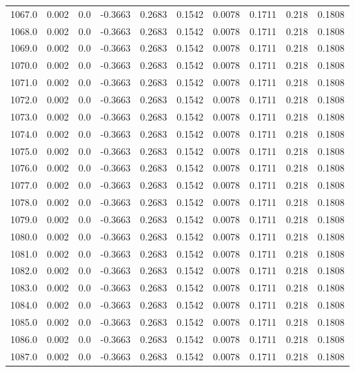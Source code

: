 \begin{longtable}{lrrrrrrrrr}
1067.0 & 0.002 & 0.0 & -0.3663 & 0.2683 & 0.1542 & 0.0078 & 0.1711 & 0.218 & 0.1808 \\
1068.0 & 0.002 & 0.0 & -0.3663 & 0.2683 & 0.1542 & 0.0078 & 0.1711 & 0.218 & 0.1808 \\
1069.0 & 0.002 & 0.0 & -0.3663 & 0.2683 & 0.1542 & 0.0078 & 0.1711 & 0.218 & 0.1808 \\
1070.0 & 0.002 & 0.0 & -0.3663 & 0.2683 & 0.1542 & 0.0078 & 0.1711 & 0.218 & 0.1808 \\
1071.0 & 0.002 & 0.0 & -0.3663 & 0.2683 & 0.1542 & 0.0078 & 0.1711 & 0.218 & 0.1808 \\
1072.0 & 0.002 & 0.0 & -0.3663 & 0.2683 & 0.1542 & 0.0078 & 0.1711 & 0.218 & 0.1808 \\
1073.0 & 0.002 & 0.0 & -0.3663 & 0.2683 & 0.1542 & 0.0078 & 0.1711 & 0.218 & 0.1808 \\
1074.0 & 0.002 & 0.0 & -0.3663 & 0.2683 & 0.1542 & 0.0078 & 0.1711 & 0.218 & 0.1808 \\
1075.0 & 0.002 & 0.0 & -0.3663 & 0.2683 & 0.1542 & 0.0078 & 0.1711 & 0.218 & 0.1808 \\
1076.0 & 0.002 & 0.0 & -0.3663 & 0.2683 & 0.1542 & 0.0078 & 0.1711 & 0.218 & 0.1808 \\
1077.0 & 0.002 & 0.0 & -0.3663 & 0.2683 & 0.1542 & 0.0078 & 0.1711 & 0.218 & 0.1808 \\
1078.0 & 0.002 & 0.0 & -0.3663 & 0.2683 & 0.1542 & 0.0078 & 0.1711 & 0.218 & 0.1808 \\
1079.0 & 0.002 & 0.0 & -0.3663 & 0.2683 & 0.1542 & 0.0078 & 0.1711 & 0.218 & 0.1808 \\
1080.0 & 0.002 & 0.0 & -0.3663 & 0.2683 & 0.1542 & 0.0078 & 0.1711 & 0.218 & 0.1808 \\
1081.0 & 0.002 & 0.0 & -0.3663 & 0.2683 & 0.1542 & 0.0078 & 0.1711 & 0.218 & 0.1808 \\
1082.0 & 0.002 & 0.0 & -0.3663 & 0.2683 & 0.1542 & 0.0078 & 0.1711 & 0.218 & 0.1808 \\
1083.0 & 0.002 & 0.0 & -0.3663 & 0.2683 & 0.1542 & 0.0078 & 0.1711 & 0.218 & 0.1808 \\
1084.0 & 0.002 & 0.0 & -0.3663 & 0.2683 & 0.1542 & 0.0078 & 0.1711 & 0.218 & 0.1808 \\
1085.0 & 0.002 & 0.0 & -0.3663 & 0.2683 & 0.1542 & 0.0078 & 0.1711 & 0.218 & 0.1808 \\
1086.0 & 0.002 & 0.0 & -0.3663 & 0.2683 & 0.1542 & 0.0078 & 0.1711 & 0.218 & 0.1808 \\
1087.0 & 0.002 & 0.0 & -0.3663 & 0.2683 & 0.1542 & 0.0078 & 0.1711 & 0.218 & 0.1808 \\

\end{longtable}
